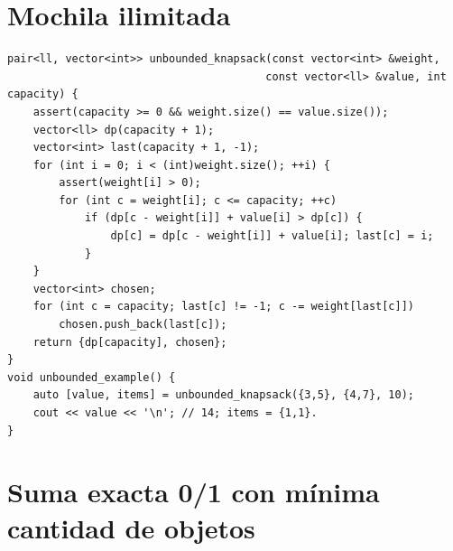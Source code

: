 \section{Mochila ilimitada}

\begin{lstlisting}[style=cpp]
pair<ll, vector<int>> unbounded_knapsack(const vector<int> &weight,
                                        const vector<ll> &value, int capacity) {
    assert(capacity >= 0 && weight.size() == value.size());
    vector<ll> dp(capacity + 1);
    vector<int> last(capacity + 1, -1);
    for (int i = 0; i < (int)weight.size(); ++i) {
        assert(weight[i] > 0);
        for (int c = weight[i]; c <= capacity; ++c)
            if (dp[c - weight[i]] + value[i] > dp[c]) {
                dp[c] = dp[c - weight[i]] + value[i]; last[c] = i;
            }
    }
    vector<int> chosen;
    for (int c = capacity; last[c] != -1; c -= weight[last[c]])
        chosen.push_back(last[c]);
    return {dp[capacity], chosen};
}
void unbounded_example() {
    auto [value, items] = unbounded_knapsack({3,5}, {4,7}, 10);
    cout << value << '\n'; // 14; items = {1,1}.
}
\end{lstlisting}


\section{Suma exacta 0/1 con m\'inima cantidad de objetos}

